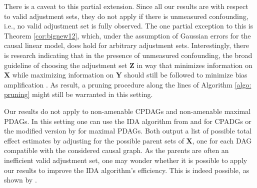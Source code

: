 \documentclass[11pt,a4paper]{article}
\theoremstyle{definition}
\theoremstyle{remark}
\newcommand{\mpdag}{maximal PDAG}
\begin{document}
There is a caveat to this partial extension. Since all our results are with respect to valid adjustment sets, they do not apply if there is unmeasured confounding, i.e., no valid adjustment set is fully observed. The one partial exception to this is Theorem \ref{cor:bignew12}, which, under the assumption of Gaussian errors for the causal linear model, does hold for arbitrary adjustment sets. Interestingly, there is research indicating that in the presence of unmeasured confounding, the broad guideline of choosing the adjustment set $\mathbf{Z}$ in way that minimizes information on $\mathbf{X}$ while maximizing information on $\mathbf{Y}$ should still be followed to minimize bias amplification \citep{pearl10,wooldridge2016should,ding2017instrumental}.  As result, a pruning procedure along the lines of Algorithm \ref{algo: pruning}  might still be warranted in this setting.






Our results do not apply to non-amenable CPDAGs and non-amenable \mpdag{}s. In this setting one can use the IDA algorithm from \citet{maathuis2009estimating} and \cite{maathuis2010predicting} for CPADGs or the modified version by \citet{perkovic17} for \mpdag{}s. Both output a list of possible total effect estimates by adjusting for the possible parent sets of $\mathbf{X}$, one for each DAG compatible with the considered causal graph. As the parents are often an inefficient valid adjustment set, one may wonder whether it is possible to apply our results to improve the IDA algorithm's efficiency. This is indeed possible, as shown by \citet{outcomeIDA}.
\end{document}
